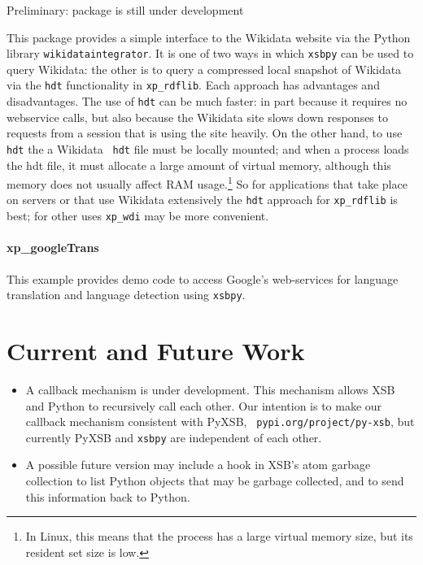 {\sc Preliminary: package is still under development}

This package provides a simple interface to the Wikidata website via
the Python library {\tt wikidataintegrator}.  It is one of two ways in
which {\tt xsbpy} can be used to query Wikidata: the other is to query
a compressed local snapshot of Wikidata via the {\tt hdt}
functionality in {\tt xp\_rdflib}.  Each approach has advantages and
disadvantages.  The use of {\tt hdt} can be much faster: in part
because it requires no webservice calls, but also because the Wikidata
site slows down responses to requests from a session that is using the
site heavily.  On the other hand, to use {\tt hdt} the a Wikidata {\tt
  hdt} file must be locally mounted; and when a process loads the hdt
file, it must allocate a large amount of virtual memory, although this
memory does not usually affect RAM usage.\footnote{In Linux, this
  means that the process has a large virtual memory size, but its
  resident set size is low.}  So for applications that take place on
servers or that use Wikidata extensively the {\tt hdt} approach for
{\tt xp\_rdflib} is best; for other uses {\tt xp\_wdi} may be more
convenient.

\begin{description}



\end{description}

\paragraph{xp\_googleTrans}
This example provides demo code to access Google's web-services for
language translation and language detection using {\tt xsbpy}.



\section{Current and Future Work}

\begin{itemize}
\item A callback mechanism is under development.  This mechanism
  allows XSB and Python to recursively call each other.  Our intention
  is to make our callback mechanism consistent with PyXSB, {\tt
    pypi.org/project/py-xsb}, but currently PyXSB and {\tt xsbpy} are
  independent of each other.

\item A possible future version may include a hook in XSB's atom
  garbage collection to list Python objects that may be garbage
  collected, and to send this information back to Python.  
\end{itemize}  

